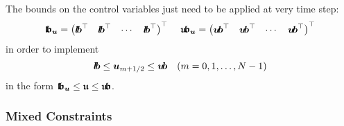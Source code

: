 \documentclass{article}
\newcommand{\tp}{\top}%
\newcommand{\vectorfont}[1]{\boldsymbol{#1}}%
\newcommand{\uvec}{\vectorfont{u}}
\newcommand{\ufrakvec}{\vectorfont{\mathfrak{u}}}
\newcommand{\lbvec}{\vectorfont{l\negthinspace b}}
\newcommand{\ubvec}{\vectorfont{u\negthinspace b}}
\newcommand{\lbfrakvec}{\vectorfont{\mathfrak{l\negthinspace b}}}
\newcommand{\ubfrakvec}{\vectorfont{\mathfrak{u\negthinspace b}}}
\begin{document}
The bounds on the control variables just need to be applied at very time step:
\[
\lbfrakvec_{\uvec}
= \begin{pmatrix} 	\lbvec^{\tp} & \lbvec^{\tp} & \cdots & \lbvec^{\tp} \end{pmatrix}^{\tp}
\,\quad
\ubfrakvec_{\uvec}
= \begin{pmatrix} 	\ubvec^{\tp} & \ubvec^{\tp} & \cdots & \ubvec^{\tp} \end{pmatrix}^{\tp}
\]
in order to implement
\[
\lbvec \leq \uvec_{m+1/2} \leq \ubvec \quad (m = 0, 1, \ldots,N-1)
\]
in the form $\lbfrakvec_{\uvec} \leq \ufrakvec \leq \ubfrakvec$.
\subsubsection*{Mixed Constraints}
\end{document}
